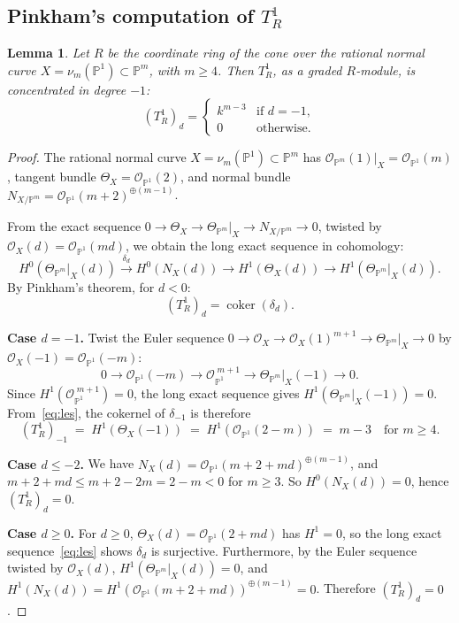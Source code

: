 \documentclass[11pt,twoside]{amsart}
\theoremstyle{plain}
\numberwithin{equation}{section}
\newtheorem{lemma}[theorem]{Lemma}
\DeclareMathOperator{\coker}{coker}
\newcommand{\OO}{\mathcal{O}}
\newcommand{\PP}{\mathbb{P}}
\theoremstyle{definition}
\begin{document}
\subsection{Pinkham's computation of $T^1_R$}
 
\begin{lemma}\label{lem:pinkham}
Let $R$ be the coordinate ring of the cone over the rational normal curve $X = \nu_m(\PP^1) \subset \PP^m$, with $m \geq 4$. Then $T^1_R$, as a graded $R$-module, is concentrated in degree $-1$:
\[
(T^1_R)_d = \begin{cases} k^{m-3} & \text{if } d = -1, \\ 0 & \text{otherwise.} \end{cases}
\]
\end{lemma}
 
\begin{proof}
The rational normal curve $X = \nu_m(\PP^1) \subset \PP^m$ has $\OO_{\PP^m}(1)|_X = \OO_{\PP^1}(m)$, tangent bundle $\Theta_X = \OO_{\PP^1}(2)$, and normal bundle $N_{X/\PP^m} = \OO_{\PP^1}(m+2)^{\oplus(m-1)}$.
 
From the exact sequence $0 \to \Theta_X \to \Theta_{\PP^m}|_X \to N_{X/\PP^m} \to 0$, twisted by $\OO_X(d) = \OO_{\PP^1}(md)$, we obtain the long exact sequence in cohomology:
\begin{equation}\label{eq:les}
H^0(\Theta_{\PP^m}|_X(d)) \xrightarrow{\;\delta_d\;} H^0(N_X(d)) \to H^1(\Theta_X(d)) \to H^1(\Theta_{\PP^m}|_X(d)).
\end{equation}
By Pinkham's theorem, for $d < 0$:
\[
(T^1_R)_d = \coker(\delta_d).
\]
 
\medskip
 
\textbf{Case $d = -1$.} Twist the Euler sequence $0 \to \OO_X \to \OO_X(1)^{m+1} \to \Theta_{\PP^m}|_X \to 0$ by $\OO_X(-1) = \OO_{\PP^1}(-m)$:
\[
0 \to \OO_{\PP^1}(-m) \to \OO_{\PP^1}^{\;m+1} \to \Theta_{\PP^m}|_X(-1) \to 0.
\]
Since $H^1(\OO_{\PP^1}^{\;m+1}) = 0$, the long exact sequence gives $H^1(\Theta_{\PP^m}|_X(-1)) = 0$. From~\eqref{eq:les}, the cokernel of $\delta_{-1}$ is therefore
\[
(T^1_R)_{-1} \;=\; H^1(\Theta_X(-1)) \;=\; H^1(\OO_{\PP^1}(2 - m)) \;=\; m - 3 \quad\text{for } m \geq 4.
\]
 
\medskip
 
\textbf{Case $d \leq -2$.} We have $N_X(d) = \OO_{\PP^1}(m + 2 + md)^{\oplus(m-1)}$, and $m + 2 + md \leq m + 2 - 2m = 2 - m < 0$ for $m \geq 3$. So $H^0(N_X(d)) = 0$, hence $(T^1_R)_d = 0$.
 
\medskip
 
\textbf{Case $d \geq 0$.} For $d \geq 0$, $\Theta_X(d) = \OO_{\PP^1}(2 + md)$ has $H^1 = 0$, so the long exact sequence~\eqref{eq:les} shows $\delta_d$ is surjective. Furthermore, by the Euler sequence twisted by $\OO_X(d)$, $H^1(\Theta_{\PP^m}|_X(d)) = 0$, and $H^1(N_X(d)) = H^1(\OO_{\PP^1}(m+2+md))^{\oplus(m-1)} = 0$. Therefore $(T^1_R)_d = 0$.
\end{proof}
 
\end{document}
